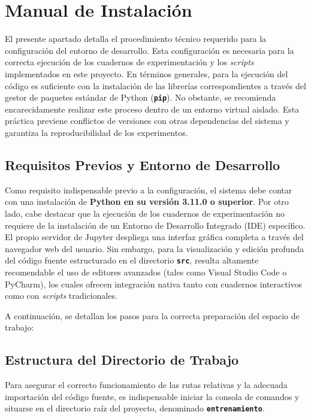 \appendix

\chapter{Manual de Instalación}
El presente apartado detalla el procedimiento técnico requerido para la configuración del entorno de desarrollo. Esta configuración es necesaria para la correcta ejecución de los cuadernos de experimentación y los \textit{scripts} implementados en este proyecto. En términos generales, para la ejecución del código es suficiente con la instalación de las librerías correspondientes a través del gestor de paquetes estándar de Python (\textbf{\texttt{pip}}). No obstante, se recomienda encarecidamente realizar este proceso dentro de un entorno virtual aislado. Esta práctica previene conflictos de versiones con otras dependencias del sistema y garantiza la reproducibilidad de los experimentos. 

\section*{Requisitos Previos y Entorno de Desarrollo}
Como requisito indispensable previo a la configuración, el sistema debe contar con una instalación de \textbf{Python en su versión 3.11.0 o superior}. Por otro lado, cabe destacar que la ejecución de los cuadernos de experimentación no requiere de la instalación de un Entorno de Desarrollo Integrado (IDE) específico. El propio servidor de Jupyter despliega una interfaz gráfica completa a través del navegador web del usuario. Sin embargo, para la visualización y edición profunda del código fuente estructurado en el directorio \textbf{\texttt{src}}, resulta altamente recomendable el uso de editores avanzados (tales como Visual Studio Code o PyCharm), los cuales ofrecen integración nativa tanto con cuadernos interactivos como con \textit{scripts} tradicionales.

A continuación, se detallan los pasos para la correcta preparación del espacio de trabajo:

\section*{Estructura del Directorio de Trabajo}
Para asegurar el correcto funcionamiento de las rutas relativas y la adecuada importación del código fuente, es indispensable iniciar la consola de comandos y situarse en el directorio raíz del proyecto, denominado \textbf{\texttt{entrenamiento}}.


